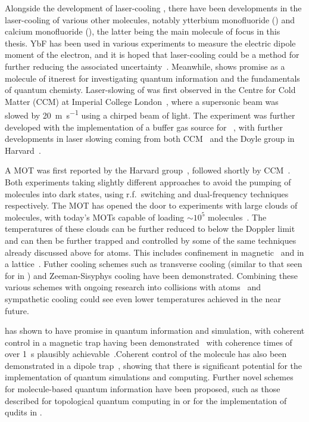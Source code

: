 Alongside the development of laser-cooling \SrF{}, there have been developments
in the laser-cooling of various other molecules, notably ytterbium monofluoride
(\YbF{}) and calcium monofluoride (\CaF{}), the latter being the main molecule
of focus in this thesis. YbF has been used in various experiments to measure
the electric dipole moment of the electron, and it is hoped that laser-cooling
could be a method for further reducing the associated uncertainty~\cite{Fitch2020}. Meanwhile, \CaF{} shows promise as a molecule of
itnerest for investigating quantum information and the fundamentals of quantum
chemisty. Laser-slowing of \CaF{} was first observed in the Centre for
Cold Matter (CCM) at Imperial College London~\cite{PhysRevA.89.053416}, where a
supersonic beam was slowed by \SI{20}{\meter\per\second} using a chirped beam of
light. The \CaF{} experiment was further developed with the implementation of a
buffer gas source for \CaF{}~\cite{Truppe2018}, with further developments in
laser slowing coming from both CCM~\cite{Truppe2017a} and the Doyle group in
Harvard~\cite{0953-4075-49-17-174001}.

A \CaF{} MOT was first reported by the Harvard
group~\cite{PhysRevLett.119.103201}, followed shortly by
CCM~\cite{Williams2017}. Both experiments taking slightly different approaches
to avoid the pumping of molecules into dark states, using r.f.\ switching and
dual-frequency techniques respectively. The \CaF{} MOT has opened the door to
experiments with large clouds of \CaF{} molecules, with today's MOTs capable of
loading $\sim10^5$ molecules~\cite{PhysRevLett.119.103201}. The temperatures of
these clouds can be further reduced to below the Doppler
limit~\cite{Truppe2017, PhysRevLett.123.033202} and can then be further trapped
and controlled by some of the same techniques already discussed above for
atoms. This includes confinement in magnetic~\cite{WilliamsMagnetic2018} and in
a lattice~\cite{Anderegg2019a}. Futher cooling schemes such as transverse
cooling (similar to that seen for \YbF in ) and
Zeeman-Sisyphys cooling have been demonstrated\cite{Fitch2016,
PhysRevLett.127.263002}.  Combining these various schemes with ongoing research
into collisions with atoms~\cite{PhysRevLett.126.153401} and sympathetic
cooling could see even lower \CaF{} temperatures achieved in the near future.

\CaF{} has shown to have promise in quantum information and simulation, with
coherent control in a magnetic trap having been
demonstrated~\cite{WilliamsMagnetic2018, Blackmore_2018} with coherence times
of over \SI{1}{\second} plausibly
achievable~\cite{PhysRevLett.124.063001}.Coherent control of the molecule has
also been demonstrated in a dipole trap~\cite{PhysRevLett.127.123202}, showing
that there is significant potential for the implementation of quantum
simulations and computing. Further novel schemes for molecule-based quantum
information have been proposed, such as those described for topological quantum
computing in  or for the implementation of qudits in
.

